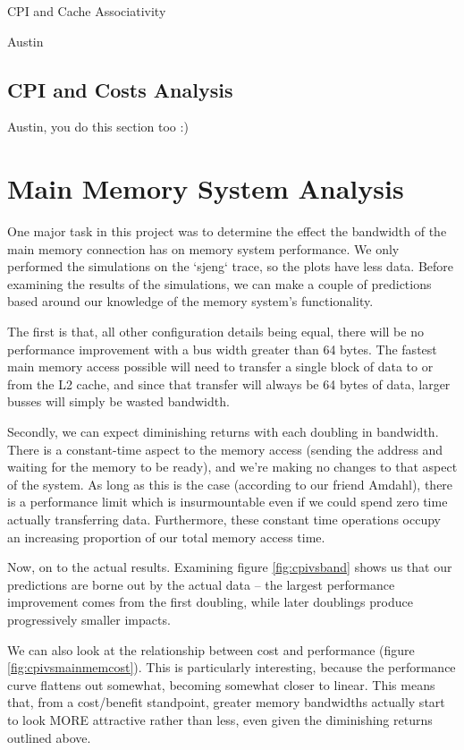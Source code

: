 \documentclass{article}
\begin{document}
CPI and Cache Associativity

Austin

\subsection{CPI and Costs Analysis}

Austin, you do this section too :)

\section{Main Memory System Analysis}

One major task in this project was to determine the effect the bandwidth of the
main memory connection has on memory system performance. We only performed the
simulations on the `sjeng` trace, so the plots have less data. Before examining
the results of the simulations, we can make a couple of predictions based around
our knowledge of the memory system's functionality.

The first is that, all other configuration details being equal, there will be no
performance improvement with a bus width greater than 64 bytes. The fastest main
memory access possible will need to transfer a single block of data to or from
the L2 cache, and since that transfer will always be 64 bytes of data, larger
busses will simply be wasted bandwidth.

Secondly, we can expect diminishing returns with each doubling in bandwidth.
There is a constant-time aspect to the memory access (sending the address and
waiting for the memory to be ready), and we're making no changes to that aspect
of the system. As long as this is the case (according to our friend Amdahl),
there is a performance limit which is insurmountable even if we could spend zero
time actually transferring data. Furthermore, these constant time operations
occupy an increasing proportion of our total memory access time.

Now, on to the actual results. Examining figure \ref{fig:cpivsband} shows us
that our predictions are borne out by the actual data -- the largest performance
improvement comes from the first doubling, while later doublings produce
progressively smaller impacts.

We can also look at the relationship between cost and performance (figure
\ref{fig:cpivsmainmemcost}). This is particularly interesting, because the
performance curve flattens out somewhat, becoming somewhat closer to linear.
This means that, from a cost/benefit standpoint, greater memory bandwidths
actually start to look MORE attractive rather than less, even given the
diminishing returns outlined above.
\end{document}
